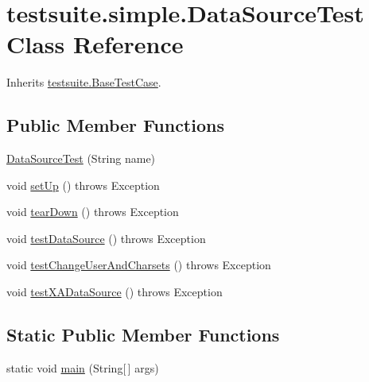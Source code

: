 \hypertarget{classtestsuite_1_1simple_1_1_data_source_test}{}\section{testsuite.\+simple.\+Data\+Source\+Test Class Reference}
\label{classtestsuite_1_1simple_1_1_data_source_test}


Inherits \mbox{\hyperlink{classtestsuite_1_1_base_test_case}{testsuite.\+Base\+Test\+Case}}.

\subsection*{Public Member Functions}
\begin{DoxyCompactItemize}
\item 
\mbox{\hyperlink{classtestsuite_1_1simple_1_1_data_source_test_ad5806ab14f44ef48ea33738cd8bcff30}{Data\+Source\+Test}} (String name)
\item 
void \mbox{\hyperlink{classtestsuite_1_1simple_1_1_data_source_test_af972007f4b839815702c12a48fc1b77d}{set\+Up}} ()  throws Exception 
\item 
void \mbox{\hyperlink{classtestsuite_1_1simple_1_1_data_source_test_abed70f64e5fb149eef73ed2e7ccf3d59}{tear\+Down}} ()  throws Exception 
\item 
void \mbox{\hyperlink{classtestsuite_1_1simple_1_1_data_source_test_aceabb67c36b42514892dc1a6a38eae1f}{test\+Data\+Source}} ()  throws Exception 
\item 
void \mbox{\hyperlink{classtestsuite_1_1simple_1_1_data_source_test_a238136c42e16d78196d3a6104c43cce5}{test\+Change\+User\+And\+Charsets}} ()  throws Exception 
\item 
void \mbox{\hyperlink{classtestsuite_1_1simple_1_1_data_source_test_aeffb3e326e27d83bfc0da82269ef479b}{test\+X\+A\+Data\+Source}} ()  throws Exception 
\end{DoxyCompactItemize}
\subsection*{Static Public Member Functions}
\begin{DoxyCompactItemize}
\item 
static void \mbox{\hyperlink{classtestsuite_1_1simple_1_1_data_source_test_a0cca4d619b5b552e16eb9332c191ce5f}{main}} (String\mbox{[}$\,$\mbox{]} args)
\end{DoxyCompactItemize}
